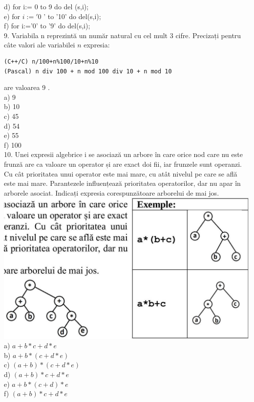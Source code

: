 \documentclass[10pt]{article}
\begin{document}
d) for i:= 0 to 9 do del (s,i);\\
e) for $i:=' 0$ ' to '10' do del(s,i);\\
f) for i:='0' to '9' do del(s,i);\\
9. Variabila n reprezintă un număr natural cu cel mult 3 cifre. Precizați pentru câte valori ale variabilei $n$ expresia:

\begin{verbatim}
(C++/C) n/100+n%100/10+n%10
(Pascal) n div 100 + n mod 100 div 10 + n mod 10
\end{verbatim}

are valoarea 9 .\\
a) 9\\
b) 10\\
c) 45\\
d) 54\\
e) 55\\
f) 100\\
10. Unei expresii algebrice i se asociază un arbore în care orice nod care nu este frunză are ca valoare un operator și are exact doi fii, iar frunzele sunt operanzi. Cu cât prioritatea unui operator este mai mare, cu atât nivelul pe care se află este mai mare. Parantezele influențează prioritatea operatorilor, dar nu apar în arborele asociat. Indicați expresia corespunzătoare arborelui de mai jos.\\
\includegraphics[max width=\textwidth, center]{2025_04_17_46e04c6acd873ea9558dg-022}\\
a) $a+b * c+d * e$\\
b) $a+b *(c+d * e)$\\
c) $(a+b) *(c+d * e)$\\
d) $(a+b) * c+d * e$\\
e) $a+b *(c+d) * e$\\
f) $(a+b) * c+d * e$\\
\end{document}
